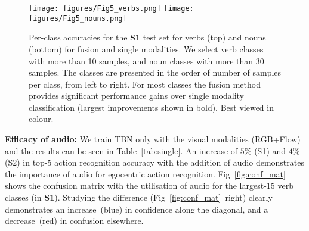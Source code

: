 \documentclass[10pt,twocolumn,letterpaper]{article}
\begin{document}
\begin{figure*}[t]
	\centering
	\texttt{[image: figures/Fig5\_verbs.png]}	\texttt{[image: figures/Fig5\_nouns.png]}
	\caption{Per-class accuracies for the \textbf{S1} test set for verbs (top) and nouns (bottom) for fusion and single modalities. We  select verb classes with more than 10 samples, and noun classes with more than 30 samples. The classes are presented in the order of number of samples per class, from left to right. For most classes the fusion method provides significant performance gains over single modality classification (largest improvements shown in bold).
	Best viewed in colour.}
	\label{fig:perclass}
\end{figure*}

\noindent \textbf{Efficacy of audio:} We train
TBN only with the visual modalities (RGB+Flow) and the results can be seen in Table~\ref{tab:single}. An increase of  $5\%$ (S1) and $4\%$ (S2) in
top-5 action recognition accuracy with the addition of audio demonstrates
the importance of audio for egocentric action recognition. 
Fig~\ref{fig:conf_mat} shows the confusion matrix with the utilisation of audio for
the largest-15 verb classes (in \textbf{S1}). Studying the difference (Fig~\ref{fig:conf_mat}~right) clearly demonstrates an increase~(blue) in confidence along the diagonal, and a decrease~(red) in confusion
elsewhere.
\end{document}
